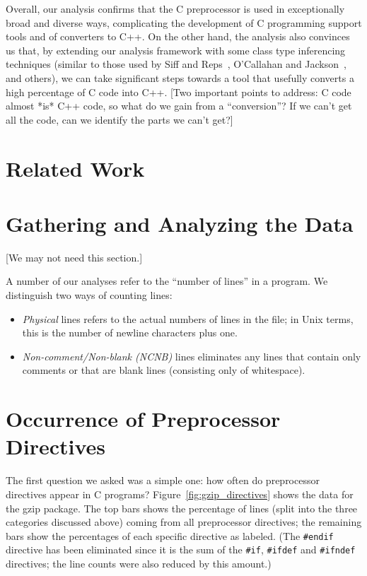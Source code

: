 Overall, our analysis confirms that the C preprocessor is used in
exceptionally broad and diverse ways, complicating the development of
C programming support tools and of converters to C++.  On the other
hand, the analysis also convinces us that, by extending our analysis
framework with some class type inferencing techniques (similar to
those used by Siff and Reps~\cite{Siff-fse96}, O'Callahan and
Jackson~\cite{OCallahan-icse97}, and others), we can take significant
steps towards a tool that usefully converts a high percentage of C
code into C++.  [Two important points to address: C code almost *is*
C++ code, so what do we gain from a ``conversion''?  If we can't get
all the code, can we identify the parts we can't get?]

\section{Related Work}\label{sec:related}

\section{Gathering and Analyzing the Data}\label{sec:gathering}

[We may not need this section.]

A number of our analyses refer to the ``number of lines'' in a
program.  We distinguish two ways of counting lines:
\begin{itemize}

\item {\em Physical} lines refers to the actual numbers of lines in
the file; in Unix terms, this is the number of newline characters plus
one.

\item {\em Non-comment/Non-blank (NCNB)} lines eliminates any lines
that contain only comments or that are blank lines (consisting only of
whitespace).

\end{itemize}

\section{Occurrence of Preprocessor Directives}\label{sec:directives}

The first question we asked was a simple one: how often do
preprocessor directives appear in C programs?
Figure~\ref{fig:gzip_directives} shows the data for the gzip package.
The top bars shows the percentage of lines (split into the three
categories discussed above) coming from all preprocessor directives;
the remaining bars show the percentages of each specific directive as
labeled.  (The \verb+#endif+ directive has been eliminated since it is
the sum of the \verb+#if+, \verb+#ifdef+ and \verb+#ifndef+ directives;
the line counts were also reduced by this amount.)

